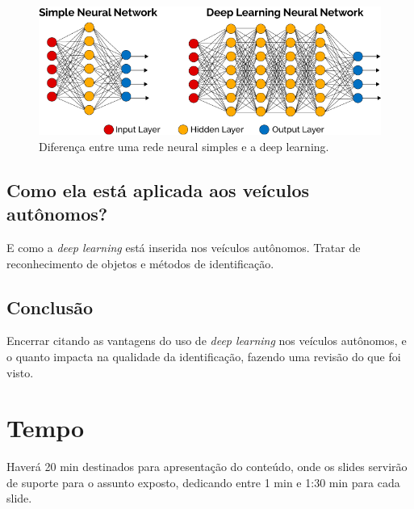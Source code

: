 \documentclass[12pt,a4paper]{article}
\begin{document}
    \begin{figure}[H]
        \centering
        \includegraphics[scale=0.5]{dp_works.png}
        \caption{Diferença entre uma rede neural simples e a deep learning.}
        \label{fig:dp_works}
    \end{figure}
    


    \subsection{Como ela está aplicada aos veículos autônomos?}
    \par E como a \emph{deep learning} está inserida nos veículos autônomos. Tratar de reconhecimento de objetos e métodos de identificação.



    \subsection{Conclusão}
    \par Encerrar citando as vantagens do uso de \emph{deep learning} nos veículos autônomos, e o quanto impacta na qualidade da identificação, fazendo uma revisão do que foi visto.

    

    \section{Tempo}
    \par Haverá 20 min destinados para apresentação do conteúdo, onde os slides servirão de suporte para o assunto exposto, dedicando entre 1 min e 1:30 min para cada slide.  
    
\end{document}
